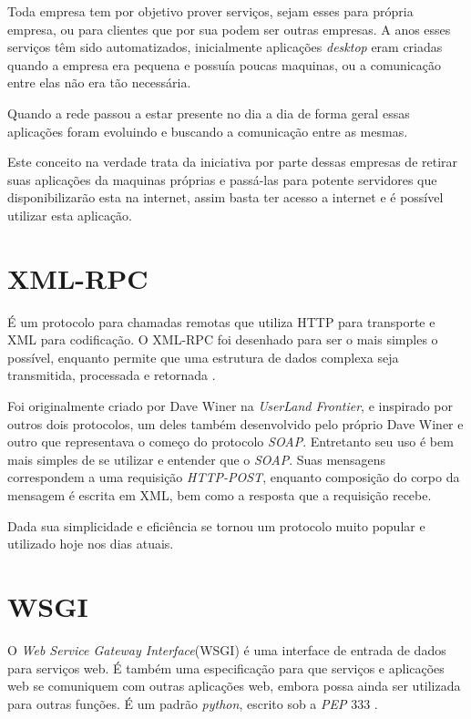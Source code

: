 Toda empresa tem por objetivo prover serviços, sejam esses para própria empresa, ou para clientes que por sua podem ser outras empresas. A anos esses serviços têm sido automatizados, inicialmente aplicações \textit{desktop} eram criadas quando a empresa era pequena e possuía poucas maquinas, ou a comunicação entre elas não era tão necessária.

Quando a rede passou a estar presente no dia a dia de forma geral essas aplicações foram evoluindo e buscando a comunicação entre as mesmas.

Este conceito na verdade trata da iniciativa por parte dessas empresas de retirar suas aplicações da maquinas próprias e passá-las para potente servidores que disponibilizarão esta na internet, assim basta ter acesso a internet e é possível utilizar esta aplicação.


\section{XML-RPC}

É um protocolo para chamadas remotas que utiliza HTTP para transporte e XML para codificação. O XML-RPC foi desenhado para ser o mais simples o possível, enquanto permite que uma estrutura de dados complexa seja transmitida, processada e retornada \cite{XMLRPC}.

Foi originalmente criado por Dave Winer na \textit{UserLand Frontier}, e inspirado por outros dois protocolos, um deles também desenvolvido pelo próprio Dave Winer e outro que representava o começo do protocolo \textit{SOAP}. Entretanto seu uso é bem mais simples de se utilizar e entender que o \textit{SOAP}. Suas mensagens correspondem a uma requisição \textit{HTTP-POST}, enquanto composição do corpo da mensagem é escrita em XML, bem como a resposta que a requisição recebe.

Dada sua simplicidade e eficiência se tornou um protocolo muito popular e utilizado hoje nos dias atuais.


\section{WSGI}

O \textit{Web Service Gateway Interface}(WSGI) é uma interface de entrada de dados para serviços web. É também uma especificação para que serviços e aplicações web se comuniquem com outras aplicações web, embora possa ainda ser utilizada para outras funções. É um padrão \textit{python}, escrito sob a \textit{PEP} 333 \cite{WSGI}.

